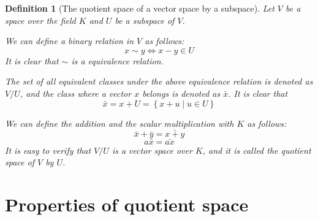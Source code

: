 \documentclass[onecolumn]{ctexart}
\newtheorem{definition}{Definition}
\begin{document}
\begin{definition}[The quotient space of a vector space by a subspace]
  Let $V$ be a space over the field $K$ and $U$ be a subspace of $V$. 

  We can define a binary relation in $V$ as follows:
  \[
    x \sim y \Leftrightarrow x - y \in U
  \]
  It is clear that $\sim$ is a equivalence relation.

  The set of all equivalent classes under the above equivalence relation is denoted as $V / U$, and the class where a vector $x$ belongs is denoted as $\bar{x}$. It is clear that
  \[
    \bar{x} = x + U = \left\{ x + u \mid u \in U \right\}
  \]

  We can define the addition and the scalar multiplication with $K$ as follows:
  \[
    \bar{x} + \bar{y} = \bar{x + y}
  \]
  \[
    a\bar{x} = \bar{ax}
  \]
  It is easy to verify that $V/U$ is a vector space over $K$, and it is called the quotient space of $V$ by $U$.
\end{definition}

\section{Properties of quotient space}
\end{document}
